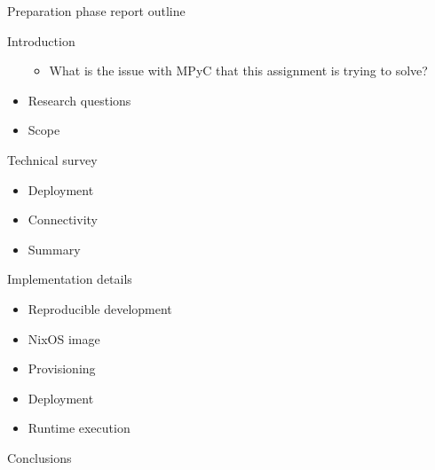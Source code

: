 \begin{frame}{Preparation phase report outline}
\begin{block}{Introduction}
\begin{itemize}
  \begin{itemize}
  \tightlist
  \item
    What is the issue with MPyC that this assignment is trying to solve?
  \end{itemize}
\item
  Research questions
\item
  Scope
\end{itemize}
\end{block}

\begin{block}{Technical survey}
\label{notes__05000-prep.md__technical-survey}
\begin{itemize}
\tightlist
\item
  Deployment
\item
  Connectivity
\item
  Summary
\end{itemize}
\end{block}

\begin{block}{Implementation details}
\label{notes__05000-prep.md__implementation-details}
\begin{itemize}
\tightlist
\item
  Reproducible development
\item
  NixOS image
\item
  Provisioning
\item
  Deployment
\item
  Runtime execution
\end{itemize}
\end{block}

\begin{block}{Conclusions}
\label{notes__05000-prep.md__conclusions}
\end{block}
\end{frame}

